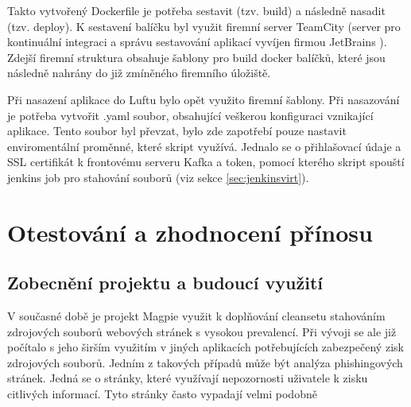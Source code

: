 \documentclass[thesis=M,czech,hidelinks]{FITthesis}[2013/05/06]
\begin{document}
Takto vytvořený Dockerfile je potřeba sestavit (tzv. build) a následně nasadit (tzv. deploy). K sestavení balíčku byl využit firemní server TeamCity (server pro kontinuální integraci a správu sestavování aplikací vyvíjen firmou JetBrains \cite{teamcity}). Zdejší firemní struktura obsahuje šablony pro build docker balíčků, které jsou následně nahrány do již zmíněného firemního úložiště.

Při nasazení aplikace do Luftu bylo opět využito firemní šablony. Při nasazování je potřeba vytvořit .yaml soubor, obsahující veškerou konfiguraci vznikající aplikace. Tento soubor byl převzat, bylo zde zapotřebí pouze nastavit enviromentální proměnné, které skript využívá. Jednalo se o přihlašovací údaje a SSL certifikát k frontovému serveru Kafka a token, pomocí kterého skript spouští jenkins job pro stahování souborů (viz sekce \ref{sec:jenkinsvirt}).











\chapter{Otestování a zhodnocení přínosu}


\section{Zobecnění projektu a budoucí využití}
V současné době je projekt Magpie využit k doplňování cleansetu stahováním zdrojových souborů webových stránek s vysokou prevalencí. Při vývoji se ale již počítalo s jeho širším využitím v jiných aplikacích potřebujících zabezpečený zisk zdrojových souborů. Jedním z takových případů může být analýza phishingových stránek. Jedná se o stránky, které využívají nepozornosti uživatele k zisku citlivých informací. Tyto stránky často vypadají velmi podobně 










 \setlength{\parskip}{10pt}





\begin{conclusion}









\end{conclusion}
\end{document}

